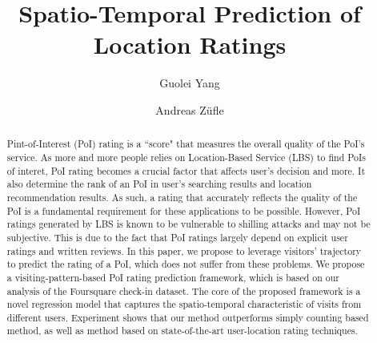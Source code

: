 \documentclass{llncs}
\begin{document}
\frontmatter          %



\title{Spatio-Temporal Prediction of Location Ratings}


\author{Guolei Yang \and Andreas Z\"ufle}



\maketitle

\begin{abstract}
Pint-of-Interest (PoI) rating is a ``score" that measures the overall quality of the PoI's service. As more and more people relies on Location-Based Service (LBS) to find PoIs of interet, PoI rating becomes a crucial factor that affects user's decision and more. It also determine the rank of an PoI in user's searching results and location recommendation results. As such, a rating that accurately reflects the quality of the PoI is a fundamental requirement for these applications to be possible. However, PoI ratings generated by LBS is known to be vulnerable to shilling attacks and may not be subjective. This is due to the fact that PoI ratings largely depend on explicit user ratings and written reviews. In this paper, we propose to leverage visitors' trajectory to predict the rating of a PoI, which does not suffer from these problems. We propose a visiting-pattern-based PoI rating prediction framework, which is based on our analysis of the Foursquare check-in dataset. The core of the proposed framework is a novel regression model that captures the spatio-temporal characteristic of visits from different users. Experiment shows that our method outperforms simply counting based method, as well as method based on state-of-the-art user-location rating techniques. 
\end{abstract}



\sloppy






%
%






%
\end{document}
